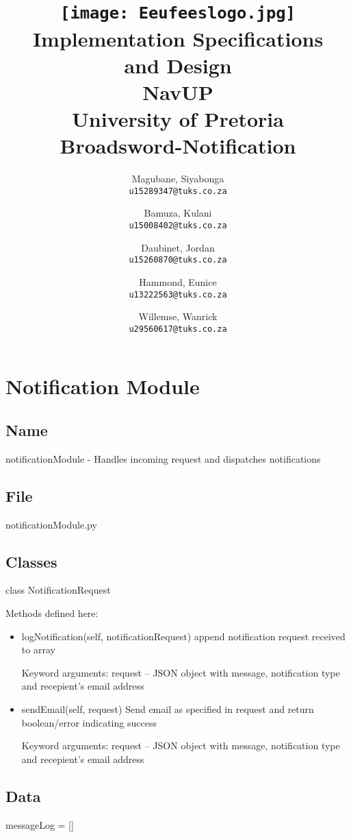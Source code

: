 \documentclass{article}
\title{\texttt{[image: Eeufeeslogo.jpg]} \\
    \vspace{1.0cm}
    Implementation Specifications \\ 
    and Design \\
    \vspace{0.5cm}
    NavUP \\
    University of Pretoria \\
    \vspace{0.5cm}
    \vspace{8.0cm}
    Broadsword-Notification\\
    \vspace{0.5cm}
}
\author{
    Magubane, Siyabonga\\
    \texttt{u15289347@tuks.co.za}
    \and
    Bamuza, Kulani\\
    \texttt{u15008402@tuks.co.za}
    \and
    Daubinet, Jordan\\
    \texttt{u15260870@tuks.co.za}
    \and
    Hammond, Eunice\\
    \texttt{u13222563@tuks.co.za}
    \and
    Willemse, Wanrick \\
    \texttt{u29560617@tuks.co.za}
    \vspace{0.5cm}
    }
\begin{document}
    \maketitle
    \thispagestyle{empty}
    \clearpage
    
    \newpage
    \thispagestyle{empty}
    \clearpage
    
    \newpage
    
  \section{Notification Module}
  
  \subsection{Name}
    notificationModule - Handles incoming request and dispatches notifications

\subsection{File}
    notificationModule.py

\subsection{Classes}

    class NotificationRequest
    
        Methods defined here:
        \begin{itemize}
 
        \item logNotification(self, notificationRequest)
            append notification request received to array
            
            Keyword arguments:
            request -- JSON object with message, notification type and recepient's email address
            
        \item sendEmail(self, request)
            Send email as specified in request and return boolean/error indicating success
            
            Keyword arguments:
            request -- JSON object with message, notification type and recepient's email address
        \end{itemize}
\subsection{Data}
    messageLog = []
            
\end{document}
